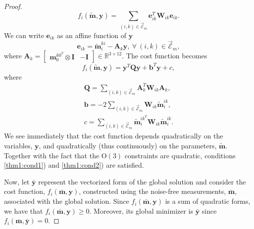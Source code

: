 \documentclass[lettersize,journal]{IEEEtran}
\newcommand{\EdgeSet}{\vec{\bm{\mathcal{E}}}}
\begin{document}
\begin{proof}
\begin{equation}
	f_i(\tilde{\bm{m}},\bm{y}) = \sum\limits_{(i,k)\in\EdgeSet_m} \bm{e}_{ik}^T \bm{W}_{ik} \bm{e}_{ik}.
\end{equation}
We can write $\bm{e}_{ik}$ as an affine function of $\bm{y}$
\begin{equation}
	\bm{e}_{ik} = \tilde{\bm{m}}_i^{ki} - \bm{A}_k \bm{y}, ~\forall ~(i,k)\in \EdgeSet_m,
\end{equation}
where $\bm{A}_k = \begin{bmatrix} \bm{m}_0^{k0^T}\otimes\bm{I}& -\bm{I} \end{bmatrix}\in\mathbb{R}^{3\times12}$. The cost function becomes 
\begin{equation}
	f_i(\tilde{\bm{m}},\bm{y}) = \bm{y}^T \bm{Q} \bm{y} + \bm{b}^T \bm{y} + c, 
\end{equation}
where
\begin{gather}
	\bm{Q} = \sum\limits_{(i,k)\in\EdgeSet_m} \bm{A}_k^T \bm{W}_{ik} \bm{A}_k, \\
	\bm{b} = -2\sum\limits_{(i,k)\in\EdgeSet_m} \bm{W}_{ik}\tilde{\bm{m}}_i^{ik}, \\
	c=\sum\limits_{(i,k)\in\EdgeSet_m} \tilde{\bm{m}}_i^{ik^T}\bm{W}_{ik}\tilde{\bm{m}}_i^{ik}.
\end{gather}
We see immediately that the cost function depends quadratically on the variables, $\bm{y}$, and quadratically (thus continuously) on the parameters, $\tilde{\bm{m}}$. Together with the fact that the $\mbox{O}(3)$ constraints are quadratic, conditions \ref{thm1:cond1}) and \ref{thm1:cond2}) are satisfied.

Now, let $\bar{\bm{y}}$ represent the vectorized form of the global solution and consider the cost function, $f_i(\bar{\bm{m}},\bm{y})$, constructed using the noise-free measurements, $\bar{\bm{m}}$, associated with the global solution. Since $f_i(\bar{\bm{m}},\bm{y})$ is a sum of quadratic forms, we have that $f_i(\bar{\bm{m}},\bm{y})\geq 0$. Moreover, its global minimizer is $\bar{\bm{y}} $ since $f_i(\bar{\bm{m}},\bar{\bm{y}})= 0$. 


\end{proof}
\end{document}
